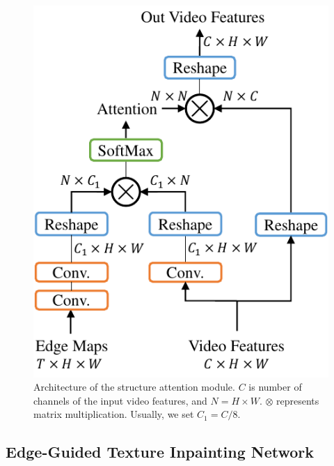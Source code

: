 \begin{figure}[t]
	\centering
	\includegraphics[width=0.65\columnwidth]{SAM}
	\caption{Architecture of the structure attention module. $C$ is number of channels of the input video features, and $N=H\times W$. $\otimes$ represents matrix multiplication. Usually, we set $C_1=C/8$.}
	\label{SEM}
\end{figure} 





\subsection{Edge-Guided Texture Inpainting Network}

